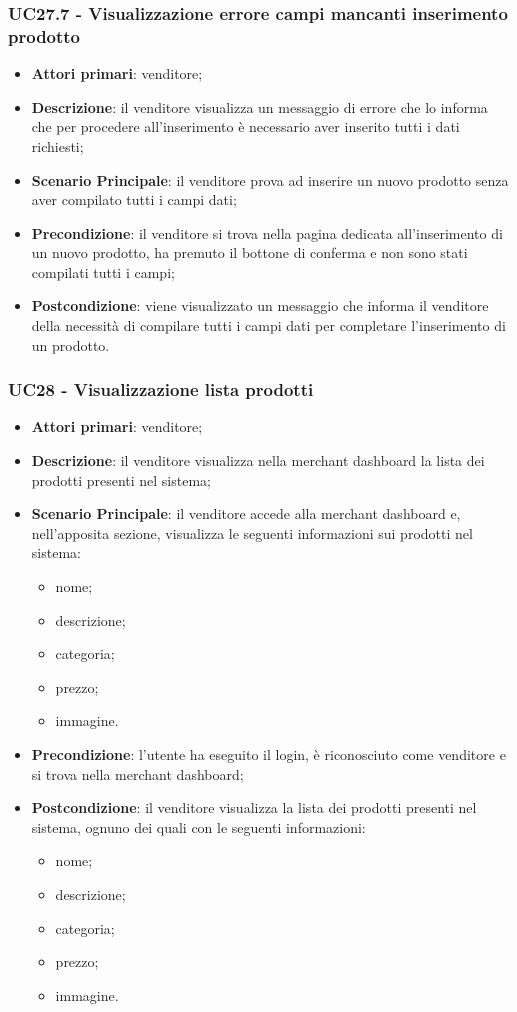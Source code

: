 \subsubsection{UC27.7 - Visualizzazione errore campi mancanti inserimento prodotto}
\begin{itemize}
\item \textbf{Attori primari}: venditore;
\item \textbf{Descrizione}: il venditore visualizza un messaggio di errore che lo informa che per procedere all'inserimento è necessario aver inserito tutti i dati richiesti;
\item \textbf{Scenario Principale}: il venditore prova ad inserire un nuovo prodotto senza aver compilato tutti i campi dati;
\item \textbf{Precondizione}: il venditore si trova nella pagina dedicata all'inserimento di un nuovo prodotto, ha premuto il bottone di conferma e non sono stati compilati tutti i campi;
\item \textbf{Postcondizione}: viene visualizzato un messaggio che informa il venditore della necessità di compilare tutti i campi dati per completare l'inserimento di un prodotto.
\end{itemize}

\subsubsection{UC28 - Visualizzazione lista prodotti}
\begin{itemize}
\item \textbf{Attori primari}: venditore;
\item \textbf{Descrizione}: il venditore visualizza nella merchant dashboard la lista dei prodotti presenti nel sistema;
\item \textbf{Scenario Principale}: il venditore accede alla merchant dashboard e, nell'apposita sezione, visualizza le seguenti informazioni sui prodotti nel sistema:
\begin{itemize}
\item nome;
\item descrizione;
\item categoria;
\item prezzo;
\item immagine.
\end{itemize}
\item \textbf{Precondizione}: l'utente ha eseguito il login, è riconosciuto come venditore e si trova nella merchant dashboard;
\item \textbf{Postcondizione}: il venditore visualizza la lista dei prodotti presenti nel sistema, ognuno dei quali con le seguenti informazioni:
\begin{itemize}
\item nome;
\item descrizione;
\item categoria;
\item prezzo;
\item immagine.
\end{itemize}
\end{itemize}

